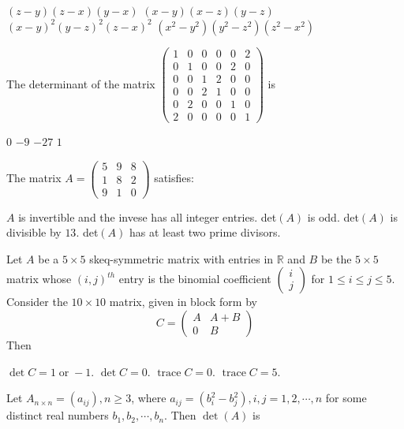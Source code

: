 \documentclass[10pt]{exam}
\DeclareMathOperator{\orr}{\text{ or }}
\DeclareMathOperator{\trace}{\text{trace}}
\newcommand{\R}{\ensuremath{\mathbb{R}}}
\begin{document}
\begin{questions}
\begin{choices}
\choice $(z-y)(z-x)(y-x)$
\choice $(x-y)(x-z)(y-z)$
\choice $(x-y)^2(y-z)^2(z-x)^2$
\choice $(x^2-y^2)(y^2-z^2)(z^2-x^2)$
\end{choices}

\question
The determinant of the matrix $\begin{pmatrix}
1 & 0 & 0 & 0 & 0 & 2 \\ 
0 & 1 & 0 & 0 & 2 & 0 \\ 
0 & 0 & 1 & 2 & 0 & 0 \\ 
0 & 0 & 2 & 1 & 0 & 0 \\ 
0 & 2 & 0 & 0 & 1 & 0 \\ 
2 & 0 & 0 & 0 & 0 & 1
\end{pmatrix} $
 is
 
\begin{oneparchoices}
\choice $0$
\choice $-9$
\choice $-27$
\choice $1$
\end{oneparchoices} 

\question 
The matrix $A =\begin{pmatrix} 5 & 9 & 8 \\ 1 & 8 & 2 \\ 9 & 1 & 0 \end{pmatrix}$ satisfies:

\begin{checkboxes}
\choice $A$ is invertible and the invese has all integer entries.
\choice det$(A)$ is odd.
\choice det$(A)$ is divisible by $13$.
\choice det$(A)$ has at least two prime divisors.
\end{checkboxes}

\question
Let $A$ be a $5\times 5$ skeq-symmetric matrix with entries in $\R$ and $B$ be the $5\times 5$ matrix whose $(i,j)^{th}$ entry is the binomial coefficient $\begin{pmatrix}
i \\ 
j
\end{pmatrix} $ for $1\leq i \leq j \leq 5$. Consider the $10 \times 10$ matrix, given in block form by
$$C=\begin{pmatrix}
A & A+B \\ 
0 & B
\end{pmatrix} $$
Then

\begin{oneparcheckboxes}
\choice $\det C=1 \orr -1$.
\choice $\det C=0$.
\choice $\trace C=0$.
\choice $\trace C =5$.
\end{oneparcheckboxes}


\question
Let $A_{n\times n}= (a_{ij}), n\geq 3$, where $a_{ij}=(b_i^2-b_j^2), i,j=1,2,\cdots ,n$ for some distinct real numbers $b_1, b_2,
\cdots , b_n$. Then $\det(A)$ is


\end{questions}
\end{document}
